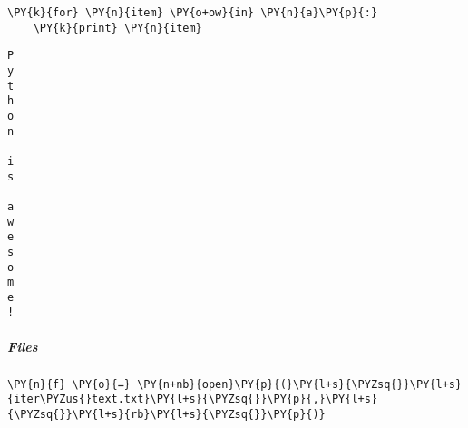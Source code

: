 
{\par%
\vspace{-1\baselineskip}%
}%
\begin{notebookcell}[25]%
\begin{addmargin}[\cellleftmargin]{0em}%
{\smaller%
\par%
%
\vspace{-1\smallerfontscale}%
\begin{Verbatim}[commandchars=\\\{\}]
\PY{k}{for} \PY{n}{item} \PY{o+ow}{in} \PY{n}{a}\PY{p}{:}
    \PY{k}{print} \PY{n}{item}
\end{Verbatim}
%
\par%
\vspace{-1\smallerfontscale}}%
\end{addmargin}
\end{notebookcell}

\par\vspace{1\smallerfontscale}%
    \begin{addmargin}[\cellleftmargin]{0em}%
    {\smaller%
    \vspace{-1\smallerfontscale}%
    
    \begin{Verbatim}[commandchars=\\\{\}]
P
y
t
h
o
n
 
i
s
 
a
w
e
s
o
m
e
!
    \end{Verbatim}
}%
    \end{addmargin}%

    \subparagraph{Files}



{\par%
\vspace{-1\baselineskip}%
}%
\begin{notebookcell}[38]%
\begin{addmargin}[\cellleftmargin]{0em}%
{\smaller%
\par%
%
\vspace{-1\smallerfontscale}%
\begin{Verbatim}[commandchars=\\\{\}]
\PY{n}{f} \PY{o}{=} \PY{n+nb}{open}\PY{p}{(}\PY{l+s}{\PYZsq{}}\PY{l+s}{iter\PYZus{}text.txt}\PY{l+s}{\PYZsq{}}\PY{p}{,}\PY{l+s}{\PYZsq{}}\PY{l+s}{rb}\PY{l+s}{\PYZsq{}}\PY{p}{)}
\end{Verbatim}
%
\par%
\vspace{-1\smallerfontscale}}%
\end{addmargin}
\end{notebookcell}


